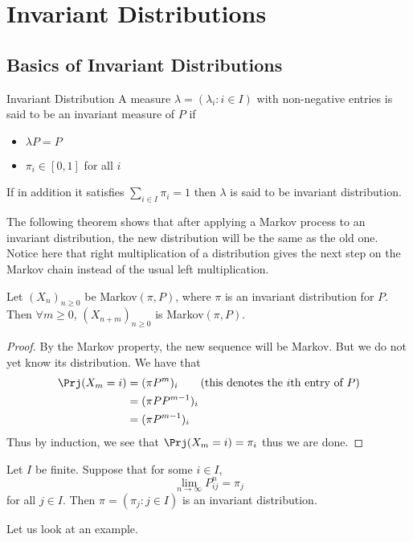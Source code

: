 \documentclass[a4paper]{article}
\begin{document}
\pagebreak
\section{Invariant Distributions}
\subsection{Basics of Invariant Distributions}
\begin{defn}{Invariant Distribution}{} A measure $\lambda=(\lambda_i:i\in I)$ with non-negative entries is said to be an invariant measure of $P$ if 
\begin{itemize}
\item $\lambda P=P$
\item $\pi_i\in[0,1]$ for all $i$
\end{itemize}
If in addition it satisfies $\sum_{i\in I}\pi_i=1$ then $\lambda$ is said to be invariant distribution. 
\end{defn}

The following theorem shows that after applying a Markov process to an invariant distribution, the new distribution will be the same as the old one. Notice here that right multiplication of a distribution gives the next step on the Markov chain instead of the usual left multiplication. 

\begin{thm}{}{} Let $(X_n)_{n\geq 0}$ be Markov$(\pi,P)$, where $\pi$ is an invariant distribution for $P$. Then $\forall m\geq 0$, $(X_{n+m})_{n\geq 0}$ is Markov$(\pi,P)$. \tcbline
\begin{proof}
By the Markov property, the new sequence will be Markov. But we do not yet know its distribution. We have that 
\begin{align*}
\Prj(X_m=i)&=(\pi P^m)_i\tag{this denotes the $i$th entry of $P$}\\
&=(\pi PP^{m-1})_i\\
&=(\pi P^{m-1})_i
\end{align*}
Thus by induction, we see that $\Prj(X_m=i)=\pi_i$ thus we are done. 
\end{proof}
\end{thm}

\begin{thm}{}{} Let $I$ be finite. Suppose that for some $i\in I$, $$\lim_{n\to\infty}P_{ij}^n=\pi_j$$ for all $j\in I$. Then $\pi=(\pi_j:j\in I)$ is an invariant distribution. 
\end{thm}

Let us look at an example. 
\end{document}
